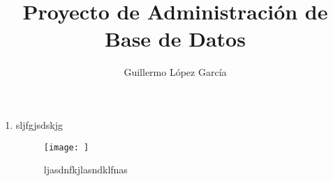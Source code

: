 \documentclass{article}
\title{Proyecto de Administración de Base de Datos}
\author{Guillermo López García}
\begin{document}

\textbf{}
\begin{enumerate}
    \item sljfgjsdskjg
        \begin{figure}[H]
        \centering
        \texttt{[image: ]}
        \caption{ljasdnfkjlasndklfnas}
        \end{figure}
        
\end{enumerate}
\end{document}
